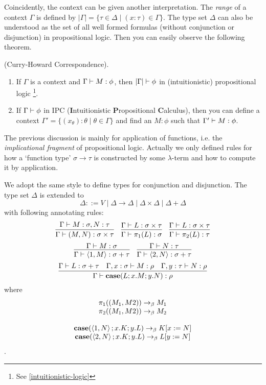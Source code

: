 Coincidently, the context can be given another interpretation. The 
{\it range} of a context $\Gamma$ is defined by
$|\Gamma|=\{\tau\in\Delta\mid(x:\tau)\in\Gamma\}$. The type set $\Delta$
can also be understood as the set of all well formed formulas (without
conjunction or disjunction) in propositional logic. Then you can easily 
observe the following theorem.
\begin{theorem}
    (Curry-Howard Correspondence).
    \begin{enumerate}
        \item If $\Gamma$ is a context and $\Gamma\vdash M:\phi$, then
        $|\Gamma| \vdash \phi$ in (intuitionistic) propositional logic
        \footnote{See \autoref{intuitionistic-logic}}.
        \item If $\Gamma\vdash \phi$ in IPC 
        ({\bf I}ntuitionistic {\bf P}ropositional {\bf C}alculus), then
        you can define a context $\Gamma'=\{(x_\theta):\theta\mid\theta\in\Gamma\}$
        and find an $M: \phi$ such that $\Gamma'\vdash M:\phi$. 
    \end{enumerate}
\end{theorem}

The previous discussion is mainly for application of functions, 
i.e. the {\it implicational fragment} of propositional logic.
Actually we only defined rules for how a `function type' $\sigma\to\tau$
is constructed by some $\lambda$-term and how to compute it by application.

We adopt the same style to define types for conjunction and disjunction.
The type set $\Delta$ is extended to
$$
\Delta ::= V\mid\Delta\to\Delta\mid\Delta\times\Delta\mid\Delta+\Delta
$$
with following annotating rules:
$$
\infer{\Gamma\proves (M, N): \sigma\times\tau}{\Gamma\proves M:\sigma, N:\tau}
\ \ \ 
\infer{\Gamma\proves \pi_1(L):\sigma}{\Gamma\proves L: \sigma\times\tau}
\ \ \ 
\infer{\Gamma\proves \pi_2(L):\tau}{\Gamma\proves L: \sigma\times\tau}
$$
$$
\infer{\Gamma\proves \left<1, M\right>:\sigma + \tau}{\Gamma\proves M:\sigma}
\ \ \ 
\infer{\Gamma\proves \left<2, N\right>:\sigma + \tau}{\Gamma\proves N:\tau}
$$
$$
\infer{\Gamma\proves \text{\bf case}(L;x.M;y.N): \rho}{
    \Gamma\proves L:\sigma+\tau &
    \Gamma, x:\sigma\proves M:\rho &
    \Gamma, y:\tau\proves N:\rho
}
$$
where 
$$
\begin{array}{c}
    \pi_1((M_1, M2)) \to_\beta M_1 \\
    \pi_2((M_1, M2)) \to_\beta M_2 \\
    \\
    \text{\bf case}(\left<1, N\right>;x.K;y.L)\to_\beta K[x:=N] \\ 
    \text{\bf case}(\left<2, N\right>;x.K;y.L)\to_\beta L[y:=N]
\end{array}
$$.

